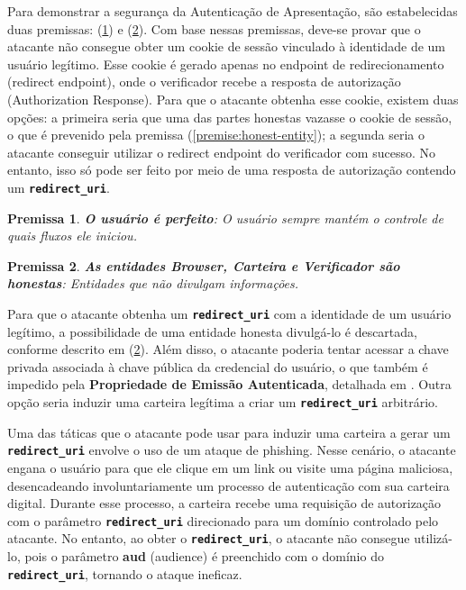 Para demonstrar a segurança da Autenticação de Apresentação, são estabelecidas duas premissas: (\ref{premise:perfect-user}) e (\ref{premise:honest-entity}). Com base nessas premissas, deve-se provar que o atacante não consegue obter um cookie de sessão vinculado à identidade de um usuário legítimo. Esse cookie é gerado apenas no endpoint de redirecionamento (redirect endpoint), onde o verificador recebe a resposta de autorização (Authorization Response). Para que o atacante obtenha esse cookie, existem duas opções: a primeira seria que uma das partes honestas vazasse o cookie de sessão, o que é prevenido pela premissa (\autoref{premise:honest-entity}); a segunda seria o atacante conseguir utilizar o redirect endpoint do verificador com sucesso. No entanto, isso só pode ser feito por meio de uma resposta de autorização contendo um \textbf{\texttt{redirect\_uri}}.


\newtheorem{premise}{Premissa}
\begin{premise}
    \textbf{O usuário é perfeito}\label{premise:perfect-user}: O usuário sempre mantém o controle de quais fluxos ele iniciou.
\end{premise}

\begin{premise}
    \textbf{As entidades Browser, Carteira e Verificador são honestas}\label{premise:honest-entity}: Entidades que não divulgam informações.
\end{premise}

Para que o atacante obtenha um \textbf{\texttt{redirect\_uri}} com a identidade de um usuário legítimo, a possibilidade de uma entidade honesta divulgá-lo é descartada, conforme descrito em (\ref{premise:honest-entity}). Além disso, o atacante poderia tentar acessar a chave privada associada à chave pública da credencial do usuário, o que também é impedido pela \textbf{Propriedade de Emissão Autenticada}, detalhada em \cite{hauck2023openid}. Outra opção seria induzir uma carteira legítima a criar um \textbf{\texttt{redirect\_uri}} arbitrário.

Uma das táticas que o atacante pode usar para induzir uma carteira a gerar um \textbf{\texttt{redirect\_uri}} envolve o uso de um ataque de phishing. Nesse cenário, o atacante engana o usuário para que ele clique em um link ou visite uma página maliciosa, desencadeando involuntariamente um processo de autenticação com sua carteira digital. Durante esse processo, a carteira recebe uma requisição de autorização com o parâmetro \textbf{\texttt{redirect\_uri}} direcionado para um domínio controlado pelo atacante. No entanto, ao obter o \textbf{\texttt{redirect\_uri}}, o atacante não consegue utilizá-lo, pois o parâmetro \textbf{aud} (audience) é preenchido com o domínio do \textbf{\texttt{redirect\_uri}}, tornando o ataque ineficaz.


